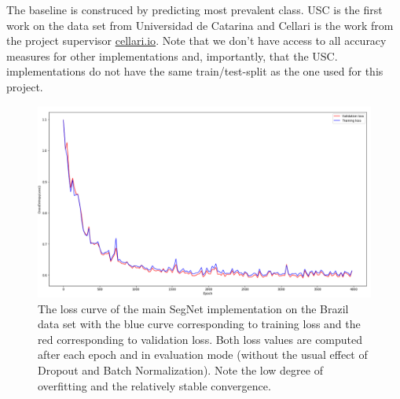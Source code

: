 \documentclass{article}
\begin{document}
The baseline is construced by predicting most prevalent class.
USC is the first work on the data set from Universidad de Catarina \cite{brazil} and Cellari is the work from the project supervisor \url{cellari.io}.
Note that we don't have access to all accuracy measures for other implementations and, importantly, that the USC. implementations do not have the same train/test-split as the one used for this project.
\begin{figure}[!htb]
	\centering
	\includegraphics[width=0.9\linewidth]{../../poster/loss}
	\caption{The loss curve of the main SegNet implementation on the Brazil data set with the blue curve corresponding to training loss and the red corresponding to validation loss. Both loss values are computed after each epoch and in {evaluation mode} (without the usual effect of Dropout and Batch Normalization). Note the low degree of overfitting and the relatively stable convergence. }
	\label{fig:loss}
\end{figure}




%

%
\end{document}
